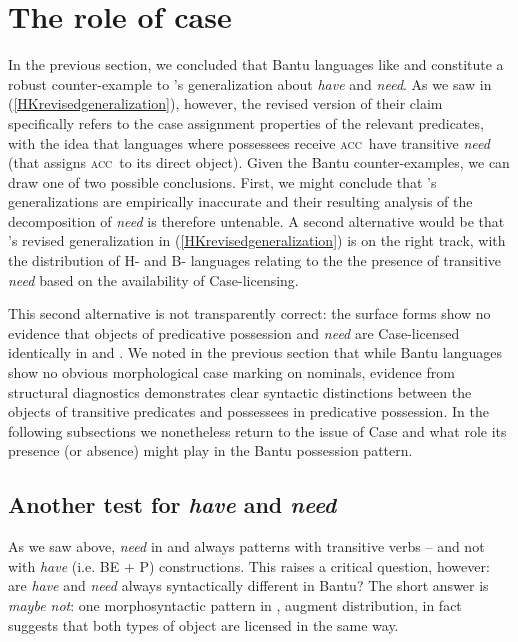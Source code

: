 \documentclass[output=paper,
modfonts
]{langscibook}
\begin{document}
\section{The role of case} \label{RoleOfCase}
In the previous section, we concluded that Bantu languages like 
and  constitute a robust counter-example to \citet{Harves:2012}'s generalization
about {\it have} and {\it need}. As we saw in
(\ref{HKrevisedgeneralization}), however, the revised version of their
claim specifically refers to the case assignment properties of the
relevant predicates, with the idea that languages where possessees
receive \textsc{acc}\ have transitive {\it need} (that assigns \textsc{acc}\ to its
direct object). Given the Bantu counter-examples, we can draw one of
two possible conclusions.  First, we might conclude that \citet{Harves:2012}'s generalizations are empirically
  inaccurate and their resulting analysis of the decomposition of
  {\it need}  is therefore untenable.  A second alternative would be that  \citet{Harves:2012}'s revised generalization in
  (\ref{HKrevisedgeneralization}) is  on the right track, with
  the distribution of H- and B- languages relating to the the presence
  of transitive {\it need} based on the availability of
  Case-licensing.



This second alternative is not transparently correct:  the
surface forms show no evidence that objects of predicative possession and  {\it
  need} are Case-licensed identically in  and . We noted in
the previous section that while Bantu languages show no obvious
morphological case marking on nominals, evidence from
structural diagnostics demonstrates  clear syntactic
distinctions between the objects of transitive predicates and
possessees in predicative possession. In the following subsections we nonetheless return to the issue of Case and what role its presence (or absence) might play in the Bantu possession pattern.

\subsection{Another test for {\it have} and {\it need}} \label{AugmentData}
As we saw above,  {\it need} in  and  always patterns
with transitive verbs -- and not with {\it have} (i.e. BE + P) constructions.
This raises a critical question, however: are {\it have} and {\it need} always syntactically different
in Bantu?  The short answer is {\it maybe not}: one morphosyntactic pattern in , augment distribution, in fact suggests that both types of object are licensed in the same way.
\end{document}
